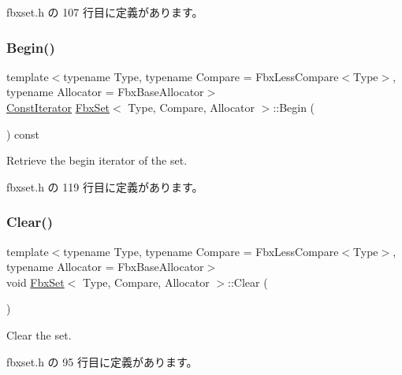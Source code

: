  fbxset.\+h の 107 行目に定義があります。

\mbox{\label{class_fbx_set_a1435632a44bad20741d19be792f0b6c0}} 
\subsubsection{\texorpdfstring{Begin()}{Begin()}\hspace{0.1cm}{\footnotesize\ttfamily [2/2]}}
{\footnotesize\ttfamily template$<$typename Type, typename Compare = Fbx\+Less\+Compare$<$\+Type$>$, typename Allocator = Fbx\+Base\+Allocator$>$ \\
\hyperlink{class_fbx_set_af9aee2f7b6a6638b816ea95bd510928c}{Const\+Iterator} \hyperlink{class_fbx_set}{Fbx\+Set}$<$ Type, Compare, Allocator $>$\+::Begin (\begin{DoxyParamCaption}{ }\end{DoxyParamCaption}) const\hspace{0.3cm}{\ttfamily [inline]}}



Retrieve the begin iterator of the set. 



 fbxset.\+h の 119 行目に定義があります。

\mbox{\label{class_fbx_set_afc01fe172f741a42492831b57d44ed8f}} 
\subsubsection{\texorpdfstring{Clear()}{Clear()}}
{\footnotesize\ttfamily template$<$typename Type, typename Compare = Fbx\+Less\+Compare$<$\+Type$>$, typename Allocator = Fbx\+Base\+Allocator$>$ \\
void \hyperlink{class_fbx_set}{Fbx\+Set}$<$ Type, Compare, Allocator $>$\+::Clear (\begin{DoxyParamCaption}{ }\end{DoxyParamCaption})\hspace{0.3cm}{\ttfamily [inline]}}



Clear the set. 



 fbxset.\+h の 95 行目に定義があります。

\mbox{\label{class_fbx_set_a453c342954283c8c7add25804a915b44}} 
